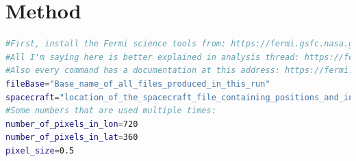
\appendix
{}

\section{Method}
\label{app:treatment}
\begin{lstlisting}[language=bash,caption={Bash script details for the treatment of the Fermi LAT data.},label={app:script}, breaklines=true]
#First, install the Fermi science tools from: https://fermi.gsfc.nasa.gov/ssc/data/analysis/software/
#All I'm saying here is better explained in analysis thread: https://fermi.gsfc.nasa.gov/ssc/data/analysis/scitools/ You can look at the following threads: Extract LAT Data, Using LAT All-sky Weekly Files, (Un)Binned Likelihood Tutorial
#Also every command has a documentation at this address: https://fermi.gsfc.nasa.gov/ssc/data/analysis/scitools/help/<name of the command>.txt
fileBase="Base_name_of_all_files_produced_in_this_run"
spacecraft="location_of_the_spacecraft_file_containing_positions_and_infos_about_the_satellite"
#Some numbers that are used multiple times:
number_of_pixels_in_lon=720
number_of_pixels_in_lat=360
pixel_size=0.5


\end{lstlisting}
